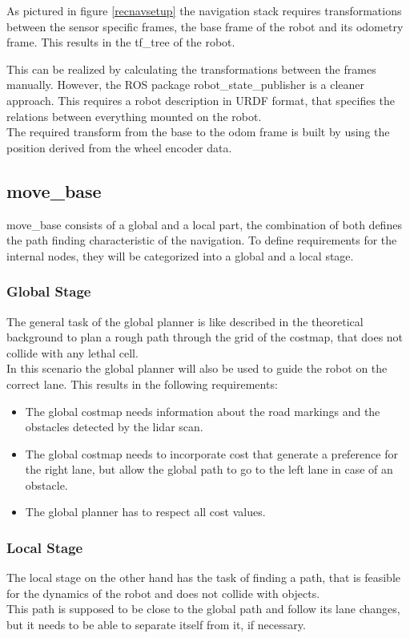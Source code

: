 As pictured in figure \ref{recnavsetup} the navigation stack requires transformations between the sensor specific frames, the base frame of the robot and its odometry frame. This results in the tf\_tree of the robot.

This can be realized by calculating the transformations between the frames manually. However, the ROS package robot\_state\_publisher is a cleaner approach. This requires a robot description in URDF format, that specifies the relations between everything mounted on the robot.\\

The required transform from the base to the odom frame is built by using the position derived from the wheel encoder data.

\subsection{move\_base}

move\_base consists of a global and a local part, the combination of both defines the path finding characteristic of the navigation. 
To define requirements for the internal nodes, they will be categorized into a global and a local stage.

\subsubsection{Global Stage}
The general task of the global planner is like described in the theoretical background to plan a rough path through the grid of the costmap, that does not collide with any lethal cell.\\

In this scenario the global planner will also be used to guide the robot on the correct lane. This results in the following requirements:

\begin{itemize}
	\item The global costmap needs information about the road markings and the obstacles detected by the lidar scan.
	\item The global costmap needs to incorporate cost that generate a preference for the right lane, but allow the global path to go to the left lane in case of an obstacle.
	\item The global planner has to respect all cost values.
\end{itemize}

\subsubsection{Local Stage}
The local stage on the other hand has the task of finding a path, that is feasible for the dynamics of the robot and does not collide with objects.\\
This path is supposed to be close to the global path and follow its lane changes, but it needs to be able to separate itself from it, if necessary.

